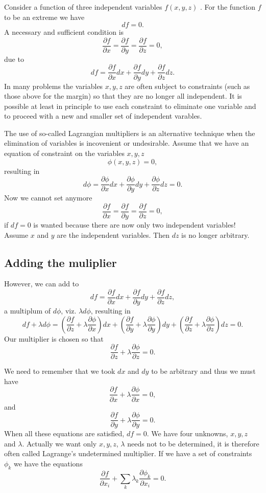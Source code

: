 \documentclass[%
oneside,                 %
final,                   %
10pt]{article}
\begin{document}
Consider a function of three independent variables $f(x,y,z)$ . For the function $f$ to be an
extreme we have
\[
df=0.
\]
A necessary and sufficient condition is
\[
\frac{\partial f}{\partial x} =\frac{\partial f}{\partial y}=\frac{\partial f}{\partial z}=0,
\]
due to
\[
df = \frac{\partial f}{\partial x}dx+\frac{\partial f}{\partial y}dy+\frac{\partial f}{\partial z}dz.
\]
In many problems the variables $x,y,z$ are often subject to constraints (such as those above for the margin)
so that they are no longer all independent. It is possible at least in principle to use each 
constraint to eliminate one variable
and to proceed with a new and smaller set of independent varables.

The use of so-called Lagrangian  multipliers is an alternative technique  when the elimination
of variables is incovenient or undesirable.  Assume that we have an equation of constraint on 
the variables $x,y,z$
\[
\phi(x,y,z) = 0,
\]
 resulting in
\[
d\phi = \frac{\partial \phi}{\partial x}dx+\frac{\partial \phi}{\partial y}dy+\frac{\partial \phi}{\partial z}dz =0.
\]
Now we cannot set anymore
\[
\frac{\partial f}{\partial x} =\frac{\partial f}{\partial y}=\frac{\partial f}{\partial z}=0,
\]
if $df=0$ is wanted
because there are now only two independent variables!  Assume $x$ and $y$ are the independent 
variables.
Then $dz$ is no longer arbitrary.

\subsection*{Adding the muliplier}

However, we can add to
\[
df = \frac{\partial f}{\partial x}dx+\frac{\partial f}{\partial y}dy+\frac{\partial f}{\partial z}dz,
\]
a multiplum of $d\phi$, viz. $\lambda d\phi$, resulting  in
\[
df+\lambda d\phi = (\frac{\partial f}{\partial z}+\lambda
\frac{\partial \phi}{\partial x})dx+(\frac{\partial f}{\partial y}+\lambda\frac{\partial \phi}{\partial y})dy+
(\frac{\partial f}{\partial z}+\lambda\frac{\partial \phi}{\partial z})dz =0.
\]
Our multiplier is chosen so that
\[
\frac{\partial f}{\partial z}+\lambda\frac{\partial \phi}{\partial z} =0.
\]

We need to remember that we took $dx$ and $dy$ to be arbitrary and thus we must have
\[
\frac{\partial f}{\partial x}+\lambda\frac{\partial \phi}{\partial x} =0,
\]
and
\[
\frac{\partial f}{\partial y}+\lambda\frac{\partial \phi}{\partial y} =0.
\]
When all these equations are satisfied, $df=0$.  We have four unknowns, $x,y,z$ and
$\lambda$. Actually we want only $x,y,z$, $\lambda$ needs not to be determined, 
it is therefore often called
Lagrange's undetermined multiplier.
If we have a set of constraints $\phi_k$ we have the equations
\[
\frac{\partial f}{\partial x_i}+\sum_k\lambda_k\frac{\partial \phi_k}{\partial x_i} =0.
\]
\end{document}
